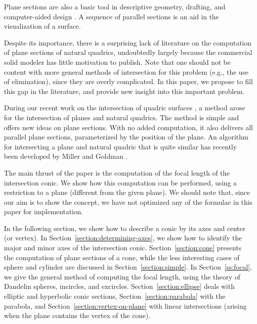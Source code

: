 Plane sections are also a basic tool in descriptive geometry, drafting,
and computer-aided design \cite{adams:1988}.
A sequence of parallel sections is an aid in the visualization of a surface.

Despite its importance, there is a surprising lack of literature 
on the computation of plane sections of natural quadrics, 
undoubtedly largely because the commercial solid modeler 
has little motivation to publish.
Note that one should not be content with
more general methods of intersection for this
problem (e.g., the use of elimination), since they are overly complicated.
In this paper, we propose to fill this gap in the literature,
and provide new insight into this important problem.

During our recent work on the intersection of quadric surfaces 
\cite{shene:1991}, 
a method arose for the intersection of planes and natural quadrics.
The method is simple and offers new ideas on plane sections.
With no added computation, it also delivers all parallel plane sections,
parameterized by the position of the plane.
An algorithm for intersecting a plane and natural quadric that is quite
similar has recently been developed by Miller and Goldman \cite{MiGo91}.

The main thrust of the paper is the computation of the focal length
of the intersection conic.
We show how this computation can be performed,
using a restriction to a plane (different from the given plane).
We should note that, since our aim is to show the concept,
we have not optimized any of the formulae in this paper for implementation.

In the following section, 
we show how to describe a conic by its axes and center (or vertex).
In Section~\ref{section:determining-axes}, 
we show how to identify the major and minor axes of the intersection conic.
Section~\ref{section:cone} 
presents the computation of plane sections of a cone,
while the less interesting cases of sphere and cylinder are discussed
in Section~\ref{section:simple}.
In Section~\ref{ss:focal},
we give the general method of computing the focal length,
using the theory of Dandelin spheres, incircles, and excircles.
Section~\ref{section:ellipse} 
deals with elliptic and hyperbolic conic sections,
Section~\ref{section:parabola} with the parabola,
and Section~\ref{section:vertex-on-plane} 
with linear intersections (arising when the plane contains 
the vertex of the cone).


